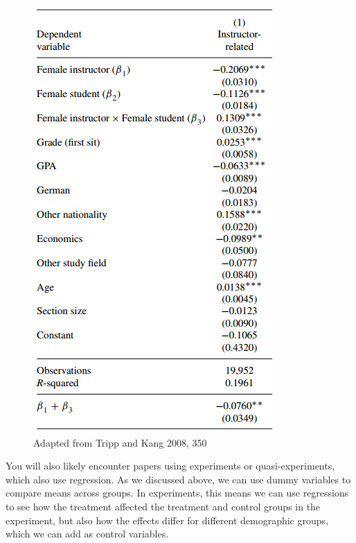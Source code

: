 \documentclass{book}
\begin{document}
\begin{figure}
\hypertarget{fig:mengel}{%
\centering
\includegraphics{images/largen/mengel.png}
\caption{Adapted from Tripp and Kang 2008, 350}\label{fig:mengel}
}
\end{figure}

You will also likely encounter papers using experiments or quasi-experiments,
which also use regression. As we discussed above, we can use dummy variables
to compare means across groups. In experiments, this means we can use
regressions to see how the treatment affected the treatment and control groups
in the experiment, but also how the effects differ for different demographic
groups, which we can add as control variables.
\end{document}
